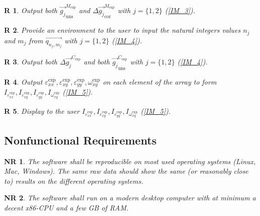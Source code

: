 \documentclass[12pt]{article}
\newtheorem{R}{R}
\newtheorem{NR}{NR}
\begin{document}
\begin{R}
\label{R_10}
\normalfont Output both $\overrightarrow{g_{j}}_{\text{uns}}^{M_{\text{exp}}}$ 
and $\Delta\overrightarrow{g_{j}}_{\text{cor}}^{M_{\text{exp}}}$ with 
$j=\{1,2\}$ (\cref{IM_3}).
\end{R}
\begin{R}
\label{R_11}
\normalfont Provide an environment to the user to input the natural integers 
values $n_j$ and $m_j$ from $\overrightarrow{q_{n_j,m_j}}$ with $j=\{1,2\}$ 
(\cref{IM_4}).
\end{R}
\begin{R}
\label{R_12}
\normalfont Output both  $\Delta \overrightarrow{g_{j}}^{C_{\text{exp}}}$ and 
both $\overrightarrow{g_{j}}_{\text{uns}}^{C_{\text{exp}}}$ with $j=\{1,2\}$ 
(\cref{IM_4}).
\end{R}
\begin{R}
\label{R_13}
\normalfont Output 
$\varepsilon_{\mathit{xx}}^{\text{exp}},\varepsilon_{\mathit{xy}}^{\text{exp}},\varepsilon_{\mathit{yy}}^{\text{exp}},\omega_{\mathit{xy}}^{\text{exp}}$ 
on each element of the array to form 
$I_{\varepsilon_{\mathit{xx}}^{\text{exp}}},I_{\varepsilon_{\mathit{xy}}^{\text{exp}}},I_{\varepsilon_{\mathit{yy}}^{\text{exp}}},I_{\omega_{\mathit{xy}}^{\text{exp}}}$ 
(\cref{IM_5}).
\end{R}
\begin{R}
\label{R_14}
\normalfont Display to the user 
$I_{\varepsilon_{\mathit{xx}}^{\text{exp}}},I_{\varepsilon_{\mathit{xy}}^{\text{exp}}},I_{\varepsilon_{\mathit{yy}}^{\text{exp}}},I_{\omega_{\mathit{xy}}^{\text{exp}}}$ 
(\cref{IM_5}).
\end{R}

\subsection{Nonfunctional Requirements}

\begin{NR}
\label{NR_1} 
\normalfont The software shall be reproducible on most used operating systems 
(Linux, Mac, Windows). The same raw data should show the same (or reasonably 
close to) results on the different operating systems. 
\end{NR}

\begin{NR}
\label{NR_2} 
\normalfont The software shall run on a modern desktop computer with at minimum 
a decent x86-CPU and a few GB of RAM.
\end{NR}
\end{document}
